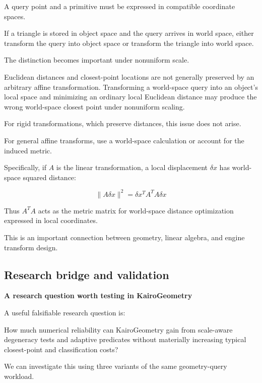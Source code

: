 A query point and a primitive must be expressed in compatible coordinate spaces.

If a triangle is stored in object space and the query arrives in world space, either transform the query into object space or transform the triangle into world space.

The distinction becomes important under nonuniform scale.

Euclidean distances and closest-point locations are not generally preserved by an arbitrary affine transformation. Transforming a world-space query into an object's local space and minimizing an ordinary local Euclidean distance may produce the wrong world-space closest point under nonuniform scaling.

For rigid transformations, which preserve distances, this issue does not arise.

For general affine transforms, use a world-space calculation or account for the induced metric.

Specifically, if \(A\) is the linear transformation, a local displacement \(\delta x\) has world-space squared distance:

\[
\|\!A\delta x\!\|^2 = \delta x^T A^T A\delta x
\]

Thus \(A^TA\) acts as the metric matrix for world-space distance optimization expressed in local coordinates.

This is an important connection between geometry, linear algebra, and engine transform design.

\subsection{Research bridge and validation}\label{03-visual-computing-i-ch021-research-bridge-and-validation}

\textbf{A research question worth testing in KairoGeometry}

A useful falsifiable research question is:

How much numerical reliability can KairoGeometry gain from scale-aware degeneracy tests and adaptive predicates without materially increasing typical closest-point and classification costs?

We can investigate this using three variants of the same geometry-query workload.

